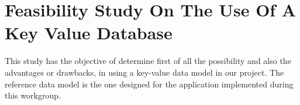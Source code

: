 \chapter{Feasibility Study On The Use Of A Key Value Database}

This study has the objective of determine first of all the possibility and also
the advantages or drawbacks, in using a key-value data model in our project. The reference data model is the one designed for the
application implemented during this workgroup.



